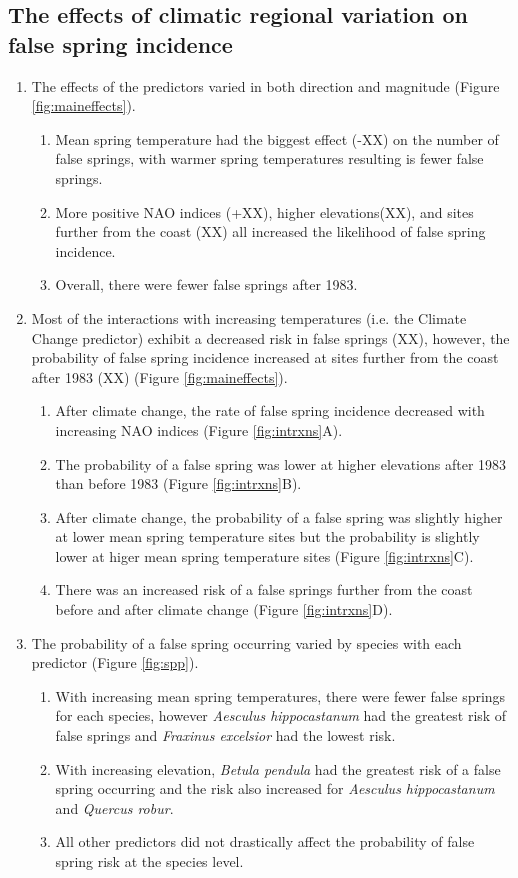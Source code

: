 \documentclass{article}\usepackage[]{graphicx}\usepackage[]{color}
\begin{document}
\subsection*{The effects of climatic regional variation on false spring incidence}
\begin{enumerate}
\item The effects of the predictors varied in both direction and magnitude (Figure \ref{fig:maineffects}).
  \begin{enumerate}
  \item Mean spring temperature had the biggest effect (-XX) on the number of false springs, with warmer spring temperatures resulting is fewer false springs. 
  \item More positive NAO indices (+XX), higher elevations(XX), and sites further from the coast (XX) all increased the likelihood of false spring incidence. 
  \item Overall, there were fewer false springs after 1983. 
  \end{enumerate}
\item Most of the interactions with increasing temperatures (i.e. the Climate Change predictor) exhibit a decreased risk in false springs (XX), however, the probability of false spring incidence increased at sites further from the coast after 1983 (XX) (Figure \ref{fig:maineffects}). 
  \begin{enumerate}
  \item After climate change, the rate of false spring incidence decreased with increasing NAO indices (Figure \ref{fig:intrxns}A).
  \item The probability of a false spring was lower at higher elevations after 1983 than before 1983 (Figure \ref{fig:intrxns}B).
  \item After climate change, the probability of a false spring was slightly higher at lower mean spring temperature sites but the probability is slightly lower at higer mean spring temperature sites (Figure \ref{fig:intrxns}C).
  \item There was an increased risk of a false springs further from the coast before and after climate change (Figure \ref{fig:intrxns}D).
  \end{enumerate}
\item The probability of a false spring occurring varied by species with each predictor (Figure \ref{fig:spp}).
  \begin{enumerate}
  \item With increasing mean spring temperatures, there were fewer false springs for each species, however \textit{Aesculus hippocastanum} had the greatest risk of false springs and \textit{Fraxinus excelsior} had the lowest risk. 
  \item With increasing elevation, \textit{Betula pendula} had the greatest risk of a false spring occurring and the risk also increased for \textit{Aesculus hippocastanum} and \textit{Quercus robur}. 
  \item All other predictors did not drastically affect the probability of false spring risk at the species level.
\end{enumerate}
\end{enumerate}
\end{document}
